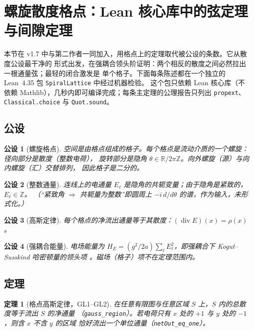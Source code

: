 \documentclass[aps,prd,preprint,superscriptaddress,amsmath,amssymb]{revtex4-2}
\newtheorem{postulate}{公设}[section]
\newtheorem{theorem}{定理}[section]
\begin{document}
\section{螺旋散度格点：Lean 核心库中的弦定理与间隙定理}
\label{sec:spiral}

本节在 v1.7 中与第二作者一同加入，用格点上的定理取代被公设的条数。它从散度公设最干净的
形式出发，在强耦合领头阶证明：两个相反的散度之间必然拉出一根通量弦；最轻的闭合激发是
单个格子。下面每条陈述都在一个独立的 Lean~4.35 包 \texttt{SpiralLattice} 中经过机器检验。
这个包只依赖 Lean 核心库（不依赖 Mathlib），几秒内即可编译完成；每条主定理的公理报告只列出
\texttt{propext}、\texttt{Classical.choice} 与 \texttt{Quot.sound}。

\subsection{公设}

\begin{postulate}[螺旋格点]
\label{post:spiral}
空间是由格点组成的格子。每个格点是流动介质的一个螺旋：径向部分是散度（整数电荷），
旋转部分是隐角 $\theta\in\mathbb{R}/2\pi\mathbb{Z}$。向外螺旋（源）与向内螺旋（汇）交替排列，
因此格子是二分的。
\end{postulate}

\begin{postulate}[整数通量]
\label{post:intflux}
连线上的电通量 $E_\ell$ 是隐角的共轭变量；由于隐角是紧致的，$E_\ell\in\mathbb{Z}$。
（``紧致角 $\Rightarrow$ 共轭量为整数''即圆周上 $-i\,d/d\theta$ 的谱，作为输入，未形式化。）
\end{postulate}

\begin{postulate}[高斯定律]
\label{post:gauss}
每个格点的净流出通量等于其散度：$(\operatorname{div}E)(x)=\rho(x)$。
\end{postulate}

\begin{postulate}[强耦合能量]
\label{post:energy}
电场能量为 $H_E=(g^2/2a)\sum_\ell E_\ell^2$，即强耦合下 Kogut--Susskind 哈密顿量的领头项
\cite{kogut1975hamiltonian}。磁场（格子）项不在定理范围内。
\end{postulate}

\subsection{定理}

\begin{theorem}[格点高斯定律，GL1--GL2]
在任意有限图与任意区域 $S$ 上，$S$ 内的总散度等于流出 $S$ 的净通量
（\texttt{gauss\_region}）。若电荷只有 $x$ 处的 $+1$ 与 $y$ 处的 $-1$，则含 $x$ 不含 $y$ 的区域
恰好流出一个单位通量（\texttt{netOut\_eq\_one}）。
\end{theorem}
\end{document}
